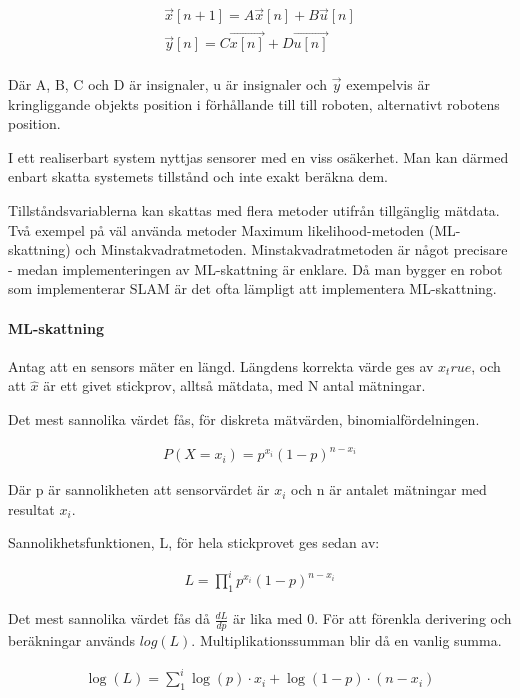 \documentclass[a4paper,12pt,fleqn]{article}
\begin{document}
\begin{gather}
\vec{x}[n+1] = A\vec{x}[n] + B\vec{u}[n] \\
\vec{y}[n] = C\vec{x[n]} + D\vec{u[n]}
\end{gather}
\\
Där A, B, C och D är insignaler, u är insignaler och $\vec{y}$ exempelvis är kringliggande objekts position i förhållande till till roboten, alternativt robotens position. 

I ett realiserbart system nyttjas sensorer med en viss osäkerhet. Man kan därmed enbart skatta systemets tillstånd och inte exakt beräkna dem. 

Tillståndsvariablerna kan skattas med flera metoder utifrån tillgänglig mätdata. Två exempel på väl använda metoder Maximum likelihood-metoden (ML-skattning) och Minstakvadratmetoden. Minstakvadratmetoden är något precisare - medan implementeringen av ML-skattning är enklare. Då man bygger en robot som implementerar SLAM är det ofta lämpligt att implementera ML-skattning. 

\paragraph{ML-skattning}

Antag att en sensors mäter en längd. Längdens korrekta värde ges av $x_true$, och att $\hat{x} $ är ett givet stickprov, alltså mätdata, med N antal mätningar. 

Det mest sannolika värdet fås, för diskreta mätvärden, binomialfördelningen. 

\begin{gather}
P(X = x_{i}) = p^{x_{i}}(1-p)^{n-x_{i}}
\end{gather}

Där p är sannolikheten att sensorvärdet är $x_i$ och n är antalet mätningar med resultat $x_i$. 

Sannolikhetsfunktionen, L, för hela stickprovet ges sedan av: 

\begin{gather}
L = \prod\limits_1^i{p^{x_{i}}(1-p)^{n-x_{i}}}
\end{gather}

Det mest sannolika värdet fås då $\frac{dL}{dp}$ är lika med 0. För att förenkla derivering och beräkningar används $log(L)$. Multiplikationssumman blir då en vanlig summa. 

\begin{gather}
\log(L) = \sum\limits_1^i{\log{(p)}{\cdot}x_{i}+\log{(1-p)}\cdot{(n-x_{i})}}
\end{gather}
\end{document}
